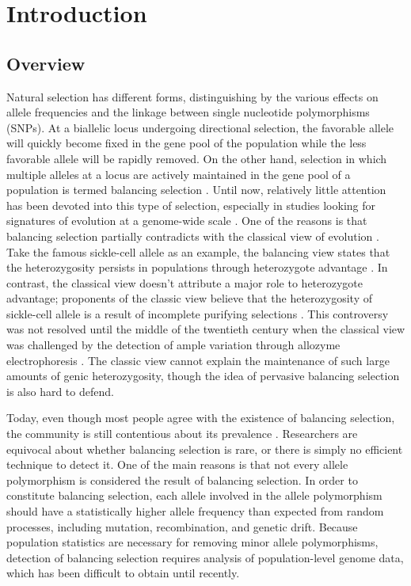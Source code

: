 \section{Introduction}
\subsection{Overview}
Natural selection has different forms, distinguishing by the various effects on allele frequencies and the linkage between single nucleotide polymorphisms (SNPs). At a biallelic locus undergoing directional selection, the favorable allele will quickly become fixed in the gene pool of the population while the less favorable allele will be rapidly removed. On the other hand, selection in which multiple alleles at a locus are actively maintained in the gene pool of a population is termed balancing selection \citep{RN1}. Until now, relatively little attention has been devoted into this type of selection, especially in studies looking for signatures of evolution at a genome-wide scale \citep{RN2}. One of the reasons is that balancing selection partially contradicts with the classical view of evolution \citep{RN3}. Take the famous sickle-cell allele as an example, the balancing view states that the heterozygosity persists in populations through heterozygote advantage \citep{RN1}. In contrast, the classical view doesn’t attribute a major role to heterozygote advantage; proponents of the classic view believe that the heterozygosity of sickle-cell allele is a result of incomplete purifying selections \citep{RN1}. This controversy was not resolved until the middle of the twentieth century when the classical view was challenged by the detection of ample variation through allozyme electrophoresis \citep{RN3}. The classic view cannot explain the maintenance of such large amounts of genic heterozygosity, though the idea of pervasive balancing selection is also hard to defend.

Today, even though most people agree with the existence of balancing selection, the community is still contentious about its prevalence \citep{RN2}. Researchers are equivocal about whether balancing selection is rare, or there is simply no efficient technique to detect it. One of the main reasons is that not every allele polymorphism is considered the result of balancing selection. In order to constitute balancing selection, each allele involved in the allele polymorphism should have a statistically higher allele frequency than expected from random processes, including mutation, recombination, and genetic drift. Because population statistics are necessary for removing minor allele polymorphisms, detection of balancing selection requires analysis of population-level genome data, which has been difficult to obtain until recently.

